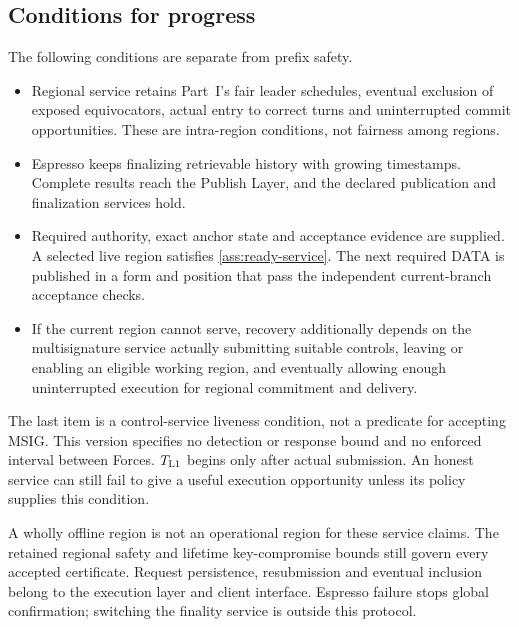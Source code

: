 \documentclass[11pt,a4paper]{article}
\newcounter{protocol}
\begin{document}
\subsection{Conditions for progress}
\label{sec:progress}
The following conditions are separate from prefix safety.
\begin{itemize}
\item Regional service retains Part~I's fair leader schedules,
eventual exclusion of exposed equivocators, actual entry to correct
turns and uninterrupted commit opportunities. These are intra-region
conditions, not fairness among regions.
\item Espresso keeps finalizing retrievable history with growing
timestamps. Complete results reach the Publish Layer, and the declared
publication and finalization services hold.
\item Required authority, exact anchor state and acceptance evidence
are supplied. A selected live region satisfies \cref{ass:ready-service}.
The next required DATA is published in a form and position that pass
the independent current-branch acceptance checks.
\item If the current region cannot serve, recovery additionally depends
on the multisignature service actually submitting suitable controls,
leaving or enabling an eligible working region, and eventually allowing
enough uninterrupted execution for regional commitment and delivery.
\end{itemize}

The last item is a control-service liveness condition, not a predicate
for accepting MSIG. This version specifies no detection or response
bound and no enforced interval between Forces. $T_{\rm L1}$ begins
only after actual submission. An honest service can still fail to give
a useful execution opportunity unless its policy supplies this condition.

A wholly offline region is not an operational region for these service
claims. The retained regional safety and lifetime key-compromise bounds
still govern every accepted certificate. Request persistence, resubmission
and eventual inclusion belong to the execution layer and client interface.
Espresso failure stops global confirmation; switching the finality
service is outside this protocol.
\end{document}
